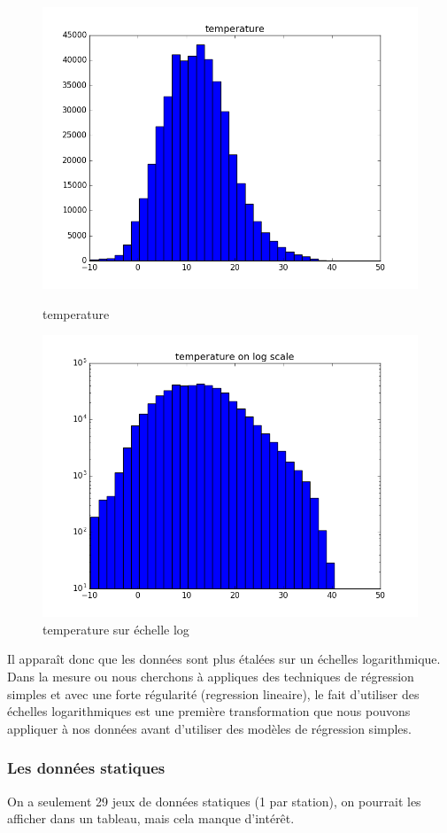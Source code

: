 \begin{figure}[H]
\captionsetup{labelformat=empty}
  \includegraphics[width=\linewidth]{images/temperature.png}
  \caption{temperature}
\endminipage\hfill
{}
  \includegraphics[width=\linewidth]{images/log_temperature.png}
  \caption{temperature sur échelle log}
\endminipage\hfill
\end{figure}

Il apparaît donc que les données sont plus étalées sur un échelles logarithmique.
Dans la mesure ou nous cherchons à appliques des techniques de régression simples et avec une forte régularité (regression lineaire), le fait d'utiliser des échelles logarithmiques est une première transformation que nous pouvons appliquer à nos données avant d'utiliser des modèles de régression simples.

\subsubsection{Les données statiques}

On a seulement 29 jeux de données statiques (1 par station), on pourrait les afficher dans un tableau, mais cela manque d'intérêt.

